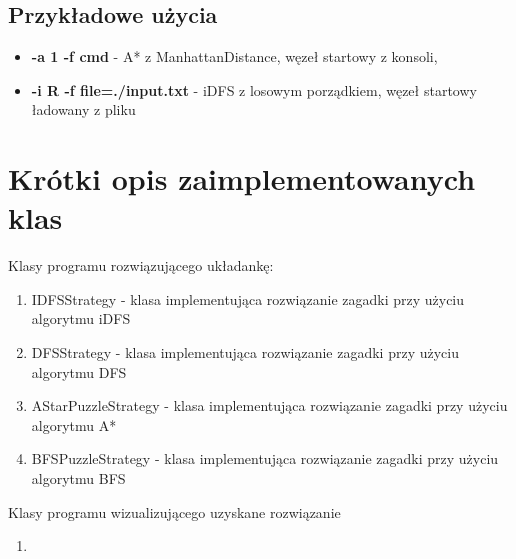 \documentclass{classrep}
\begin{document}
		\subsection{Przykładowe użycia}
			\begin{itemize}
				\item \textbf{-a 1 -f cmd} - A* z ManhattanDistance, węzeł startowy z konsoli,
				\item \textbf{-i R -f file=./input.txt} - iDFS z losowym porządkiem, węzeł startowy ładowany z pliku
			\end{itemize}
	
	\section{Krótki opis zaimplementowanych klas}
		Klasy programu rozwiązującego układankę:
		\begin{enumerate}
			\item IDFSStrategy - klasa implementująca rozwiązanie zagadki przy użyciu algorytmu iDFS
			\item DFSStrategy - klasa implementująca rozwiązanie zagadki przy użyciu algorytmu DFS
			\item AStarPuzzleStrategy - klasa implementująca rozwiązanie zagadki przy użyciu algorytmu A*
			\item BFSPuzzleStrategy - klasa implementująca rozwiązanie zagadki przy użyciu algorytmu BFS
		\end{enumerate}
		Klasy programu wizualizującego uzyskane rozwiązanie
		\begin{enumerate}
			\item
		\end{enumerate}
		
\end{document}
